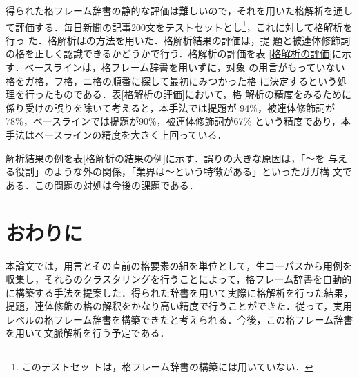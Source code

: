 得られた格フレーム辞書の静的な評価は難しいので，それを用いた格解析を通し
て評価する．毎日新聞の記事200文をテストセットとし\footnote{このテストセッ
トは，格フレーム辞書の構築には用いていない．}，これに対して格解析を行っ
た．格解析は\cite{Kuro-IEICE1994}の方法を用いた．格解析結果の評価は，提
題と被連体修飾詞の格を正しく認識できるかどうかで行う．格解析の評価を表 
\ref{格解析の評価}に示す．ベースラインは，格フレーム辞書を用いずに，対象
の用言がもっていない格をガ格，ヲ格，ニ格の順番に探して最初にみつかった格
に決定するという処理を行ったものである．表\ref{格解析の評価}において，格
解析の精度をみるために係り受けの誤りを除いて考えると，本手法では提題が
94\%，被連体修飾詞が78\%，ベースラインでは提題が90\%，被連体修飾詞が67\% 
という精度であり，本手法はベースラインの精度を大きく上回っている．

解析結果の例を表\ref{格解析の結果の例}に示す．誤りの大きな原因は，「〜を
与える役割」のような外の関係，「業界は〜という特徴がある」といったガガ構
文である．この問題の対処は今後の課題である．


\section{おわりに}

本論文では，用言とその直前の格要素の組を単位として，生コーパスから用例を
収集し，それらのクラスタリングを行うことによって，格フレーム辞書を自動的
に構築する手法を提案した．得られた辞書を用いて実際に格解析を行った結果，
提題，連体修飾の格の解釈をかなり高い精度で行うことができた．従って，実用
レベルの格フレーム辞書を構築できたと考えられる．今後，この格フレーム辞書
を用いて文脈解析を行う予定である．




\begin{biography}


\end{biography}


